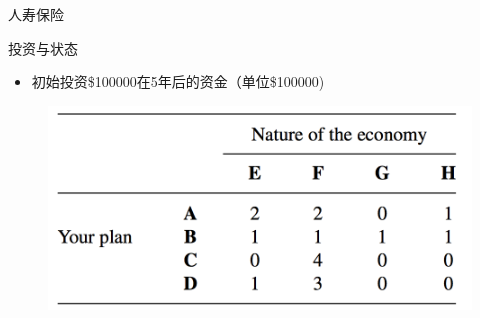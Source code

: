 \documentclass[UTF8]{ctexbeamer}
\begin{document}
\begin{frame}{人寿保险}
  
\end{frame}

\begin{frame}{投资与状态}

  \begin{itemize}
  \item 初始投资\$100000在5年后的资金（单位\$100000)
  \end{itemize}
  
  \begin{figure}
    \includegraphics[width=0.8\textwidth{}]{plan.png}
  \end{figure}


\end{frame}
\end{document}
\end{itemize}
\end{frame}
\end{document}
